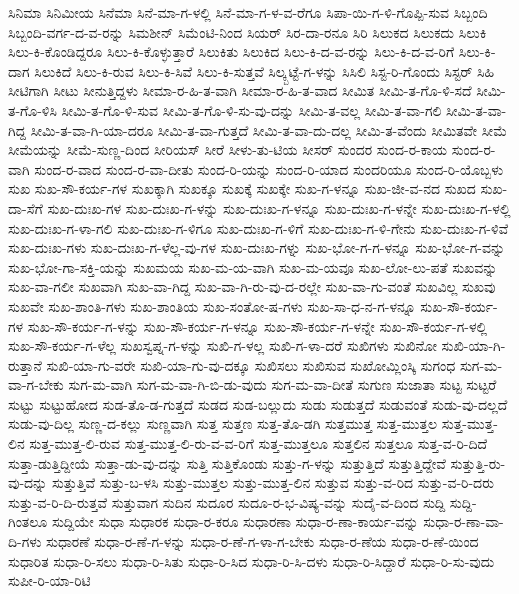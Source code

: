 {ಸಿನಿಮಾ
ಸಿನಿಮೀಯ
ಸಿನೆಮಾ
ಸಿನೆ-ಮಾ-ಗ-ಳಲ್ಲಿ
ಸಿನೆ-ಮಾ-ಗ-ಳ-ವ-ರೆಗೂ
ಸಿಪಾ-ಯಿ-ಗ-ಳಿ-ಗೊಪ್ಪಿ-ಸುವ
ಸಿಬ್ಬಂದಿ
ಸಿಬ್ಬಂದಿ-ವರ್ಗ-ದ-ವ-ರನ್ನು
ಸಿಮಶೀನ್
ಸಿಮೆಂಟಿ-ನಿಂದ
ಸಿಯರ್
ಸಿರ-ದಾ-ರನೂ
ಸಿರಿ
ಸಿಲುಕದ
ಸಿಲುಕದು
ಸಿಲುಕಿ
ಸಿಲು-ಕಿ-ಕೊಂಡಿದ್ದರೂ
ಸಿಲು-ಕಿ-ಕೊಳ್ಳುತ್ತಾರೆ
ಸಿಲುಕಿತು
ಸಿಲುಕಿದ
ಸಿಲು-ಕಿ-ದ-ವ-ರನ್ನು
ಸಿಲು-ಕಿ-ದ-ವ-ರಿಗೆ
ಸಿಲು-ಕಿ-ದಾಗ
ಸಿಲುಕಿದೆ
ಸಿಲು-ಕಿ-ರುವ
ಸಿಲು-ಕಿ-ಸಿವೆ
ಸಿಲು-ಕಿ-ಸುತ್ತವೆ
ಸಿಲ್ಕ್ಬಟ್ಟೆ-ಗ-ಳನ್ನು
ಸಿಸಿಲಿ
ಸಿಸ್ಟ-ರಿ-ಗೊಂದು
ಸಿಸ್ಟರ್
ಸಿಹಿ
ಸೀಟಿಗಾಗಿ
ಸೀಟು
ಸೀನುತ್ತಿದ್ದಳು
ಸೀಮಾ-ರ-ಹಿ-ತ-ವಾಗಿ
ಸೀಮಾ-ರ-ಹಿ-ತ-ವಾದ
ಸೀಮಿತ
ಸೀಮಿ-ತ-ಗೊ-ಳಿ-ಸದೆ
ಸೀಮಿ-ತ-ಗೊ-ಳಿಸಿ
ಸೀಮಿ-ತ-ಗೊ-ಳಿ-ಸುವ
ಸೀಮಿ-ತ-ಗೊ-ಳಿ-ಸು-ವು-ದನ್ನು
ಸೀಮಿ-ತ-ವಲ್ಲ
ಸೀಮಿ-ತ-ವಾ-ಗಲಿ
ಸೀಮಿ-ತ-ವಾ-ಗಿದ್ದ
ಸೀಮಿ-ತ-ವಾ-ಗಿ-ಯಾ-ದರೂ
ಸೀಮಿ-ತ-ವಾ-ಗುತ್ತದೆ
ಸೀಮಿ-ತ-ವಾ-ದು-ದಲ್ಲ
ಸೀಮಿ-ತ-ವೆಂದು
ಸೀಮಿತವೇ
ಸೀಮೆ
ಸೀಮೆಯನ್ನು
ಸೀಮೆ-ಸುಣ್ಣ-ದಿಂದ
ಸೀರಿಯಸ್
ಸೀರೆ
ಸೀಳು-ತು-ಟಿಯ
ಸೀಸರ್
ಸುಂದರ
ಸುಂದ-ರ-ಕಾಯ
ಸುಂದ-ರ-ವಾಗಿ
ಸುಂದ-ರ-ವಾದ
ಸುಂದ-ರ-ವಾ-ದೀತು
ಸುಂದ-ರಿ-ಯನ್ನು
ಸುಂದ-ರಿ-ಯಾದ
ಸುಂದರಿಯೂ
ಸುಂದ-ರಿ-ಯೊಬ್ಬಳು
ಸುಖ
ಸುಖ-ಸೌ-ಕರ್ಯ-ಗಳ
ಸುಖಕ್ಕಾಗಿ
ಸುಖಕ್ಕೂ
ಸುಖಕ್ಕೆ
ಸುಖಕ್ಕೇ
ಸುಖ-ಗ-ಳನ್ನೂ
ಸುಖ-ಜೀ-ವ-ನದ
ಸುಖದ
ಸುಖ-ದಾ-ಸೆಗೆ
ಸುಖ-ದುಃಖ-ಗಳ
ಸುಖ-ದುಃಖ-ಗ-ಳನ್ನು
ಸುಖ-ದುಃಖ-ಗ-ಳನ್ನೂ
ಸುಖ-ದುಃಖ-ಗ-ಳನ್ನೇ
ಸುಖ-ದುಃಖ-ಗ-ಳಲ್ಲಿ
ಸುಖ-ದುಃಖ-ಗ-ಳಾ-ಗಲಿ
ಸುಖ-ದುಃಖ-ಗ-ಳಿಗೂ
ಸುಖ-ದುಃಖ-ಗ-ಳಿಗೆ
ಸುಖ-ದುಃಖ-ಗ-ಳಿ-ಗೇನು
ಸುಖ-ದುಃಖ-ಗ-ಳಿವೆ
ಸುಖ-ದುಃಖ-ಗಳು
ಸುಖ-ದುಃಖ-ಗ-ಳೆಲ್ಲ-ವು-ಗಳ
ಸುಖ-ದುಃಖ-ಗಳ್ನು
ಸುಖ-ಭೋ-ಗ-ಗ-ಳನ್ನೂ
ಸುಖ-ಭೋ-ಗ-ವನ್ನು
ಸುಖ-ಭೋ-ಗಾ-ಸಕ್ತಿ-ಯನ್ನು
ಸುಖಮಯ
ಸುಖ-ಮ-ಯ-ವಾಗಿ
ಸುಖ-ಮ-ಯವೂ
ಸುಖ-ಲೋ-ಲು-ಪತೆ
ಸುಖವನ್ನು
ಸುಖ-ವಾ-ಗಲೀ
ಸುಖವಾಗಿ
ಸುಖ-ವಾ-ಗಿದ್ದ
ಸುಖ-ವಾ-ಗಿ-ರು-ವು-ದ-ರಲ್ಲೇ
ಸುಖ-ವಾ-ಗು-ವಂತೆ
ಸುಖವಿಲ್ಲ
ಸುಖವು
ಸುಖವೇ
ಸುಖ-ಶಾಂತಿ-ಗಳು
ಸುಖ-ಶಾಂತಿಯ
ಸುಖ-ಸಂತೋ-ಷ-ಗಳು
ಸುಖ-ಸಾ-ಧ-ನ-ಗ-ಳನ್ನೂ
ಸುಖ-ಸೌ-ಕರ್ಯ-ಗಳ
ಸುಖ-ಸೌ-ಕರ್ಯ-ಗ-ಳನ್ನು
ಸುಖ-ಸೌ-ಕರ್ಯ-ಗ-ಳನ್ನೂ
ಸುಖ-ಸೌ-ಕರ್ಯ-ಗ-ಳನ್ನೇ
ಸುಖ-ಸೌ-ಕರ್ಯ-ಗ-ಳಲ್ಲಿ
ಸುಖ-ಸೌ-ಕರ್ಯ-ಗ-ಳೆಲ್ಲ
ಸುಖಸ್ವಪ್ನ-ಗ-ಳನ್ನು
ಸುಖಿ-ಗ-ಳಲ್ಲ
ಸುಖಿ-ಗ-ಳಾ-ದರೆ
ಸುಖಿಗಳು
ಸುಖಿನೋ
ಸುಖಿ-ಯಾ-ಗಿ-ರುತ್ತಾನೆ
ಸುಖಿ-ಯಾ-ಗು-ವರೇ
ಸುಖಿ-ಯಾ-ಗು-ವು-ದಕ್ಕೂ
ಸುಖಿಸಲು
ಸುಖಿಸುವ
ಸುಖೋಮ್ಲಿಂಸ್ಕಿ
ಸುಗಂಧ
ಸುಗ-ಮ-ವಾ-ಗ-ಬೇಕು
ಸುಗ-ಮ-ವಾಗಿ
ಸುಗ-ಮ-ವಾ-ಗಿ-ಬಿ-ಡು-ವುದು
ಸುಗ-ಮ-ವಾ-ದೀತೆ
ಸುಗುಣ
ಸುಜಾತಾ
ಸುಟ್ಟ
ಸುಟ್ಟರೆ
ಸುಟ್ಟು
ಸುಟ್ಟುಹೋದ
ಸುಡ-ತೊ-ಡ-ಗುತ್ತದೆ
ಸುಡದ
ಸುಡ-ಬಲ್ಲುದು
ಸುಡು
ಸುಡುತ್ತದೆ
ಸುಡುವಂತೆ
ಸುಡು-ವು-ದಲ್ಲದೆ
ಸುಡು-ವು-ದಿಲ್ಲ
ಸುಣ್ಣ-ದ-ಕಲ್ಲು
ಸುಣ್ಣವಾಗಿ
ಸುತ್ತ
ಸುತ್ತಣ
ಸುತ್ತ-ತೊ-ಡಗಿ
ಸುತ್ತಮುತ್ತ
ಸುತ್ತ-ಮುತ್ತಲ
ಸುತ್ತ-ಮುತ್ತ-ಲಿನ
ಸುತ್ತ-ಮುತ್ತ-ಲಿ-ರುವ
ಸುತ್ತ-ಮುತ್ತ-ಲಿ-ರು-ವ-ವ-ರಿಗೆ
ಸುತ್ತ-ಮುತ್ತಲೂ
ಸುತ್ತಲಿನ
ಸುತ್ತಲೂ
ಸುತ್ತ-ವ-ರಿ-ದಿದೆ
ಸುತ್ತಾ-ಡುತ್ತಿದ್ದೀಯೆ
ಸುತ್ತಾ-ಡು-ವು-ದನ್ನು
ಸುತ್ತಿ
ಸುತ್ತಿಕೊಂಡು
ಸುತ್ತು-ಗ-ಳನ್ನು
ಸುತ್ತುತ್ತಿದೆ
ಸುತ್ತುತ್ತಿದ್ದೇವೆ
ಸುತ್ತುತ್ತಿ-ರು-ವು-ದನ್ನು
ಸುತ್ತುತ್ತಿವೆ
ಸುತ್ತು-ಬ-ಳಸಿ
ಸುತ್ತು-ಮುತ್ತಲ
ಸುತ್ತು-ಮುತ್ತ-ಲಿನ
ಸುತ್ತುವ
ಸುತ್ತು-ವ-ರಿದ
ಸುತ್ತು-ವ-ರಿ-ದರು
ಸುತ್ತು-ವ-ರಿ-ದಿ-ರುತ್ತವೆ
ಸುತ್ತುವಾಗ
ಸುದಿನ
ಸುದೂರ
ಸುದೂ-ರ-ಭ-ವಿಷ್ಯ-ವನ್ನು
ಸುದೈ-ವ-ದಿಂದ
ಸುದ್ದಿ
ಸುದ್ದಿ-ಗಿಂತಲೂ
ಸುದ್ದಿಯೇ
ಸುಧಾ
ಸುಧಾರಕ
ಸುಧಾ-ರ-ಕರೂ
ಸುಧಾರಣಾ
ಸುಧಾ-ರ-ಣಾ-ಕಾರ್ಯ-ವನ್ನು
ಸುಧಾ-ರ-ಣಾ-ವಾ-ದಿ-ಗಳು
ಸುಧಾರಣೆ
ಸುಧಾ-ರ-ಣೆ-ಗ-ಳನ್ನು
ಸುಧಾ-ರ-ಣೆ-ಗ-ಳಾ-ಗ-ಬೇಕು
ಸುಧಾ-ರ-ಣೆಯ
ಸುಧಾ-ರ-ಣೆ-ಯಿಂದ
ಸುಧಾರಿತ
ಸುಧಾ-ರಿ-ಸಲು
ಸುಧಾ-ರಿ-ಸಿತು
ಸುಧಾ-ರಿ-ಸಿದ
ಸುಧಾ-ರಿ-ಸಿ-ದಳು
ಸುಧಾ-ರಿ-ಸಿದ್ದಾರೆ
ಸುಧಾ-ರಿ-ಸು-ವುದು
ಸುಪೀ-ರಿ-ಯಾ-ರಿಟಿ
}
